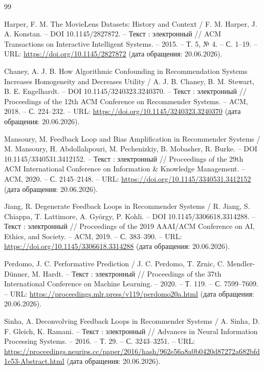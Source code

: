 \begin{thebibliography}{99}

Harper, F. M. The MovieLens Datasets: History and Context / F. M. Harper, J. A. Konstan. -- DOI 10.1145/2827872. -- Текст : электронный // ACM Transactions on Interactive Intelligent Systems. -- 2015. -- Т. 5, № 4. -- С. 1--19. -- URL: \url{https://doi.org/10.1145/2827872} (дата обращения: 20.06.2026).

Chaney, A. J. B. How Algorithmic Confounding in Recommendation Systems Increases Homogeneity and Decreases Utility / A. J. B. Chaney, B. M. Stewart, B. E. Engelhardt. -- DOI 10.1145/3240323.3240370. -- Текст : электронный // Proceedings of the 12th ACM Conference on Recommender Systems. -- ACM, 2018. -- С. 224--232. -- URL: \url{https://doi.org/10.1145/3240323.3240370} (дата обращения: 20.06.2026).

Mansoury, M. Feedback Loop and Bias Amplification in Recommender Systems / M. Mansoury, H. Abdollahpouri, M. Pechenizkiy, B. Mobasher, R. Burke. -- DOI 10.1145/3340531.3412152. -- Текст : электронный // Proceedings of the 29th ACM International Conference on Information \& Knowledge Management. -- ACM, 2020. -- С. 2145--2148. -- URL: \url{https://doi.org/10.1145/3340531.3412152} (дата обращения: 20.06.2026).

Jiang, R. Degenerate Feedback Loops in Recommender Systems / R. Jiang, S. Chiappa, T. Lattimore, A. György, P. Kohli. -- DOI 10.1145/3306618.3314288. -- Текст : электронный // Proceedings of the 2019 AAAI/ACM Conference on AI, Ethics, and Society. -- ACM, 2019. -- С. 383--390. -- URL: \url{https://doi.org/10.1145/3306618.3314288} (дата обращения: 20.06.2026).

Perdomo, J. C. Performative Prediction / J. C. Perdomo, T. Zrnic, C. Mendler-Dünner, M. Hardt. -- Текст : электронный // Proceedings of the 37th International Conference on Machine Learning. -- 2020. -- Т. 119. -- С. 7599--7609. -- URL: \url{https://proceedings.mlr.press/v119/perdomo20a.html} (дата обращения: 20.06.2026).

Sinha, A. Deconvolving Feedback Loops in Recommender Systems / A. Sinha, D. F. Gleich, K. Ramani. -- Текст : электронный // Advances in Neural Information Processing Systems. -- 2016. -- Т. 29. -- С. 3243--3251. -- URL: \url{https://proceedings.neurips.cc/paper/2016/hash/962e56a8a0b0420d87272a682bfd1e53-Abstract.html} (дата обращения: 20.06.2026).


\end{thebibliography}

